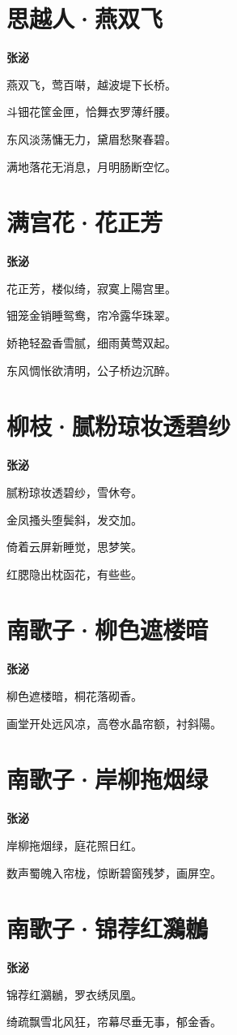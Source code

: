 \documentclass[12pt,a4paper]{ctexbook}
\begin{document}
\section{思越人·燕双飞}
\textbf{张泌}\par\vspace{0.5em}
燕双飞，莺百啭，越波堤下长桥。\par
斗钿花筐金匣，恰舞衣罗薄纤腰。\par
东风淡荡慵无力，黛眉愁聚春碧。\par
满地落花无消息，月明肠断空忆。\par

\section{满宫花·花正芳}
\textbf{张泌}\par\vspace{0.5em}
花正芳，楼似绮，寂寞上陽宫里。\par
钿笼金销睡鸳鸯，帘冷露华珠翠。\par
娇艳轻盈香雪腻，细雨黄莺双起。\par
东风惆怅欲清明，公子桥边沉醉。\par

\section{柳枝·腻粉琼妆透碧纱}
\textbf{张泌}\par\vspace{0.5em}
腻粉琼妆透碧纱，雪休夸。\par
金凤搔头堕鬓斜，发交加。\par
倚着云屏新睡觉，思梦笑。\par
红腮隐出枕函花，有些些。\par

\section{南歌子·柳色遮楼暗}
\textbf{张泌}\par\vspace{0.5em}
柳色遮楼暗，桐花落砌香。\par
画堂开处远风凉，高卷水晶帘额，衬斜陽。\par

\section{南歌子·岸柳拖烟绿}
\textbf{张泌}\par\vspace{0.5em}
岸柳拖烟绿，庭花照日红。\par
数声蜀魄入帘栊，惊断碧窗残梦，画屏空。\par

\section{南歌子·锦荐红鸂鶒}
\textbf{张泌}\par\vspace{0.5em}
锦荐红鸂鶒，罗衣绣凤凰。\par
绮疏飘雪北风狂，帘幕尽垂无事，郁金香。\par
\end{document}
